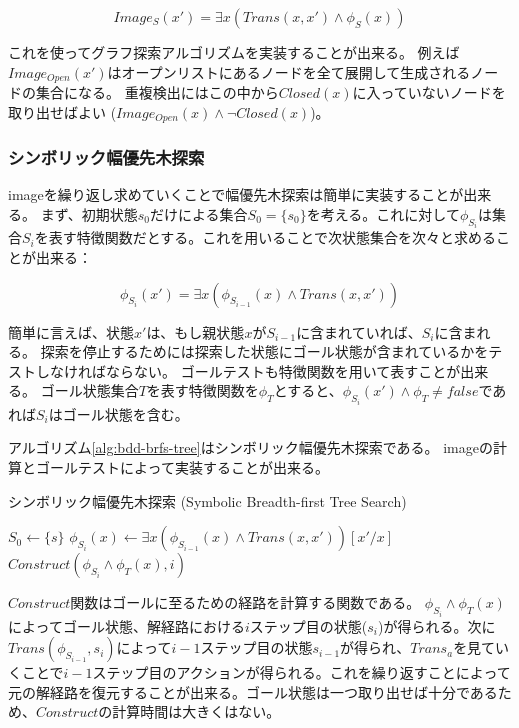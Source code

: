 \begin{equation}
	Image_S(x') = \exists x (Trans(x,x') \land \phi_S(x))
\end{equation}

これを使ってグラフ探索アルゴリズムを実装することが出来る。
例えば$Image_{Open}(x')$はオープンリストにあるノードを全て展開して生成されるノードの集合になる。
重複検出にはこの中から$Closed(x)$に入っていないノードを取り出せばよい ($Image_{Open}(x) \land \lnot Closed(x)$)。

\subsubsection{シンボリック幅優先木探索}

imageを繰り返し求めていくことで幅優先木探索は簡単に実装することが出来る。
まず、初期状態$s_0$だけによる集合$S_0 = \{s_0\}$を考える。これに対して$\phi_{S_{i}}$は集合$S_i$を表す特徴関数だとする。これを用いることで次状態集合を次々と求めることが出来る：

\begin{equation}
	\phi_{S_i}(x') = \exists x (\phi_{S_{i-1}}(x) \land Trans(x,x'))
\end{equation}

簡単に言えば、状態$x'$は、もし親状態$x$が$S_{i-1}$に含まれていれば、$S_i$に含まれる。
探索を停止するためには探索した状態にゴール状態が含まれているかをテストしなければならない。
ゴールテストも特徴関数を用いて表すことが出来る。
ゴール状態集合$T$を表す特徴関数を$\phi_T$とすると、$\phi_{S_i}(x') \land \phi_T \neq false$であれば$S_i$はゴール状態を含む。

アルゴリズム\ref{alg:bdd-brfs-tree}はシンボリック幅優先木探索である。
imageの計算とゴールテストによって実装することが出来る。


\begin{algorithm}
\caption{シンボリック幅優先木探索 (Symbolic Breadth-first Tree Search)}
\label{alg:bdd-brfs-tree}
	$S_0 \leftarrow \{s\}$\;
	 {
		$\phi_{S_i}(x) \leftarrow \exists x (\phi_{S_{i-1}}(x) \land Trans(x,x'))[x'/x]$\;
		 {
			\Return $Construct(\phi_{S_i} \land \phi_T(x), i)$\;
		}
	}
\end{algorithm}


$Construct$関数はゴールに至るための経路を計算する関数である。
$\phi_{S_i} \land \phi_T(x)$によってゴール状態、解経路における$i$ステップ目の状態($s_i$)が得られる。次に$Trans(\phi_{S_{i-1}}, s_i)$によって$i-1$ステップ目の状態$s_{i-1}$が得られ、$Trans_a$を見ていくことで$i-1$ステップ目のアクションが得られる。これを繰り返すことによって元の解経路を復元することが出来る。ゴール状態は一つ取り出せば十分であるため、$Construct$の計算時間は大きくはない。

